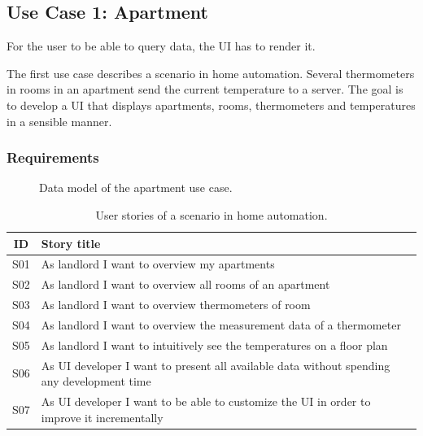 \subsection{Use Case 1: Apartment}\label{sec:usecase1}
For the user to be able to query data, the UI has to render it.

The first use case describes a scenario in home automation. Several thermometers in rooms in an apartment send the current temperature to a server. The goal is to develop a UI that displays apartments, rooms, thermometers and temperatures in a sensible manner.

\subsubsection{Requirements}

\begin{figure}[!htb]
  \caption{Data model of the apartment use case.}
\end{figure}

\begin{table}
  \begin{center}
    \begin{tabular}{ |c|l| }
      \hline
      ID & Story title \\
      \hline
      S01 & As landlord I want to overview my apartments \\
      S02 & As landlord I want to overview all rooms of an apartment \\
      S03 & As landlord I want to overview thermometers of room \\
      S04 & As landlord I want to overview the measurement data of a thermometer \\
      S05 & As landlord I want to intuitively see the temperatures on a floor plan \\
      S06 & As UI developer I want to present all available data without spending any development time \\
      S07 & As UI developer I want to be able to customize the UI in order to improve it incrementally \\
      \hline
    \end{tabular}
    \caption{User stories of a scenario in home automation.}
    \label{tab:usecase1}
  \end{center}
\end{table}

